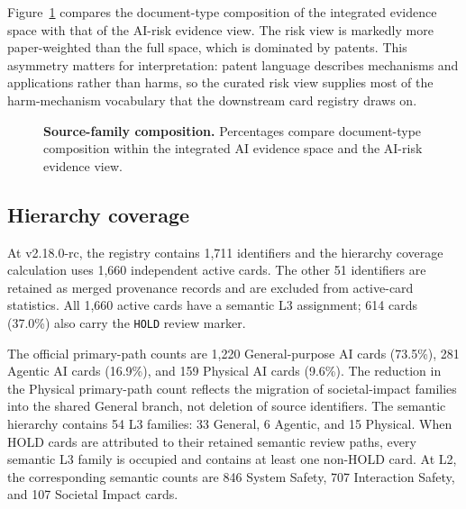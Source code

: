 \documentclass[11pt,a4paper]{article}
\newcommand{\code}[1]{\texttt{#1}}
\begin{document}
Figure~\ref{fig:composition} compares the document-type composition of the
integrated evidence space with that of the AI-risk evidence view. The risk view
is markedly more paper-weighted than the full space, which is dominated by
patents. This asymmetry matters for interpretation: patent language describes
mechanisms and applications rather than harms, so the curated risk view
supplies most of the harm-mechanism vocabulary that the downstream card
registry draws on.

\begin{figure}[H]
\centering
{}
\caption{\textbf{Source-family composition.} Percentages compare document-type
composition within the integrated AI evidence space and the AI-risk evidence
view.}
\label{fig:composition}
\end{figure}

\subsection{Hierarchy coverage}

At v2.18.0-rc, the registry contains 1,711 identifiers and the hierarchy
coverage calculation uses 1,660 independent active cards. The other 51
identifiers are retained as merged provenance records and are excluded from
active-card statistics. All 1,660 active cards have a semantic L3 assignment;
614 cards (37.0\%) also carry the \code{HOLD} review marker.

The official primary-path counts are 1,220 General-purpose AI cards (73.5\%),
281 Agentic AI cards (16.9\%), and 159 Physical AI cards (9.6\%). The reduction
in the Physical primary-path count reflects the migration of societal-impact
families into the shared General branch, not deletion of source identifiers.
The semantic hierarchy contains 54 L3 families: 33 General, 6 Agentic, and 15
Physical. When HOLD cards are attributed to their retained semantic review
paths, every semantic L3 family is occupied and contains at least one non-HOLD
card. At L2, the corresponding semantic counts are 846 System Safety, 707
Interaction Safety, and 107 Societal Impact cards.
\end{document}
